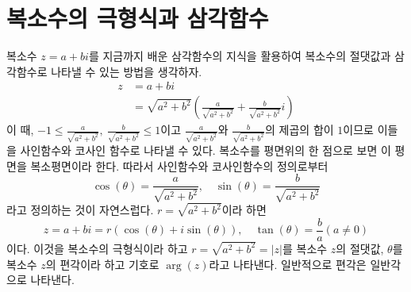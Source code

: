 \documentclass[11pt, a4paper]{book}
\begin{document}
\section{복소수의 극형식과 삼각함수}
복소수 $z=a+bi$를 지금까지 배운 삼각함수의 지식을 활용하여 복소수의 절댓값과 삼각함수로 나타낼 수 있는 방법을 생각하자.
\begin{align*}
	z & = a+b i \\
	  & = \sqrt{a^{2} +b^{2}} \left(\frac{a}{\sqrt{a^{2}+b^{2}}} +\frac{b}{\sqrt{a^{2}+b^{2}}} i \right)
\end{align*}
 이 때, $-1\leq \frac{a}{\sqrt{a^{2}+b^{2}}},\: \frac{b}{\sqrt{a^{2}+b^{2}}} \leq 1$이고 $\frac{a}{\sqrt{a^{2}+b^{2}}}$와 $\frac{b}{\sqrt{a^{2}+b^{2}}}$의 제곱의 합이 $1$이므로 이들을 사인함수와 코사인 함수로 나타낼 수 있다. 복소수를 평면위의 한 점으로 보면 이 평면을 {\color{red}복소평면}이라 한다. 따라서 사인함수와 코사인함수의 정의로부터
 \[
 \cos(\theta) = \frac{a}{\sqrt{a^{2}+b^{2}}}, \quad \sin(\theta) = \frac{b}{\sqrt{a^{2}+b^{2}}}
 \]
 라고 정의하는 것이 자연스럽다. $r=\sqrt{a^{2} +b^{2}}$이라 하면
 \[
 z=a+bi = r\left( \cos(\theta)+ i \sin(\theta)\right), \quad \tan(\theta) =\frac{b}{a}\left(a \neq 0\right)
 \]
 이다. 이것을 복소수의 {\color{red}극형식}이라 하고 $r=\sqrt{a^{2}+b^{2}}=\vert z \vert$를 복소수 $z$의 {\color{red}절댓값}, $\theta$를 복소수 $z$의 {\color{red}편각}이라 하고 기호로 $\arg(z)$라고 나타낸다. 일반적으로 편각은 일반각으로 나타낸다.
 
\end{document}
